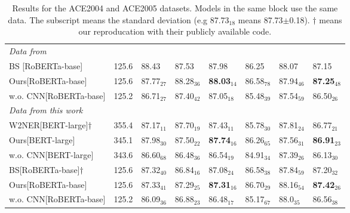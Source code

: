 \documentclass[11pt]{article}
\begin{document}
\begin{table*}[!ht]
\begin{tabular}{lp{3em}llllll}
  \midrule  
  \textit{Data from \citet{DBLP:conf/acl/Zhu022}}                                            &                            &             &             &             &             &             &             \\
  BS \cite{DBLP:conf/acl/Zhu022}[RoBERTa-base] & 125.6                      & 88.43       & 87.53       & 87.98       & 86.25       & 88.07       & 87.15       \\
  Ours[RoBERTa-base]                                        & 125.6                      & 87.77$_{27}$ & 88.28$_{36}$ & \textbf{88.03}$_{14}$ & 86.58$_{78}$ & 87.94$_{46}$ & \textbf{87.25}$_{48}$ \\
  \quad w.o. CNN[RoBERTa-base]                                    & 125.2                      & 86.71$_{27}$ & 87.40$_{42}$ & 87.05$_{18}$ & 85.48$_{39}$ & 87.54$_{59}$ & 86.50$_{26}$ \\
  \midrule
  \textit{Data from this work}                                   &                            &             &             &             &             &             &             \\
  W2NER[BERT-large]$\dagger$                                       & 355.4                      &      87.17$_{11}$       &     87.70$_{19}$        &     87.43$_{11}$        &        85.78$_{30}$     &      87.81$_{24}$       &     86.77$_{21}$        \\
  Ours[BERT-large]                                        & 345.1                     &   87.98$_{30}$    &    87.50$_{22}$    &   \textbf{87.74}$_{16}$  &       86.26$_{65}$      &       87.56$_{31}$               &    \textbf{86.91}$_{23}$    \\
  \quad w.o. CNN[BERT-large]                                    & 343.6                      &       86.60$_{68}$    &      86.48$_{36}$    & 86.54$_{19}$    &     84.91$_{34}$       &      87.39$_{26}$         &  86.13$_{30}$  \\
  BS[RoBERTa-base]$\dagger$                          & 125.6                      &    87.32$_{40}$         &       86.84$_{16}$      &       87.08$_{24}$      &     86.58$_{38}$        &      87.84$_{59}$       &   87.20$_{32}$          \\
  Ours[RoBERTa-base]                                        & 125.6                      &    87.33$_{41}$    &      87.29$_{25}$       &        \textbf{87.31}$_{16}$     &           86.70$_{29}$    &       88.16$_{54}$      &      \textbf{87.42}$_{26}$     \\
  \quad w.o. CNN[RoBERTa-base]                                    & 125.2                      &     86.09$_{36}$        &    86.88$_{23}$         &   86.48$_{17}$          &      85.17$_{67}$       &      88.0$_{35}$       &  86.56$_{38}$    \\
  \bottomrule
  \end{tabular}
  \caption{Results for the ACE2004 and ACE2005 datasets. Models in the same block use the same data. The subscript means the standard deviation (e.g 87.73$_{18}$ means 87.73$\pm$0.18). $\dagger$ means our reproducation with their publicly available code. } \label{tab:main}
\end{table*}
\end{document}
